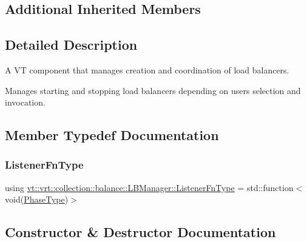 \subsection*{Additional Inherited Members}


\subsection{Detailed Description}
A VT component that manages creation and coordination of load balancers. 

Manages starting and stopping load balancers depending on user\textquotesingle{}s selection and invocation. 

\subsection{Member Typedef Documentation}
\mbox{\label{structvt_1_1vrt_1_1collection_1_1balance_1_1_l_b_manager_a1bb65b50c7cefb8c139a9f40a83ca18b}} 
\subsubsection{\texorpdfstring{Listener\+Fn\+Type}{ListenerFnType}}
{\footnotesize\ttfamily using \hyperlink{structvt_1_1vrt_1_1collection_1_1balance_1_1_l_b_manager_a1bb65b50c7cefb8c139a9f40a83ca18b}{vt\+::vrt\+::collection\+::balance\+::\+L\+B\+Manager\+::\+Listener\+Fn\+Type} =  std\+::function$<$void(\hyperlink{namespacevt_a46ce6733d5cdbd735d561b7b4029f6d7}{Phase\+Type})$>$}



\subsection{Constructor \& Destructor Documentation}
\mbox{\label{structvt_1_1vrt_1_1collection_1_1balance_1_1_l_b_manager_a4adad6931af7d5ff2cb983859ed939f3}} 
